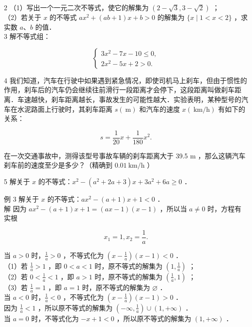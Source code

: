 \documentclass[10pt]{article}
\begin{document}
2 （1）写出一个一元二次不等式，使它的解集为 \((2-\sqrt{3}, 3-\sqrt{2})\) ；\\
（2）若关于 \(x\) 的不等式 \(a x^{2}+(a b+1) x+b>0\) 的解集为 \(\{x \mid 1<x<2\}\) ，求实数 \(a 、 b\) 的值．\\
3 解不等式组：

\[
\left\{\begin{array}{l}
3 x^{2}-7 x-10 \leqslant 0, \\
2 x^{2}-5 x+2>0 .
\end{array}\right.
\]

4 我们知道，汽车在行驶中如果遇到紧急情况，即使司机马上刹车，但由于惯性的作用，刹车后的汽车仍会继续往前滑行一段距离才会停下，这段距离叫做刹车距离．车速越快，刹车距离越长，事故发生的可能性越大．实验表明，某种型号的汽车在水泥路面上行驶时，其刹车距离 \(s(\mathrm{~m})\) 和汽车的速度 \(x(\mathrm{~km} / \mathrm{h})\) 有如下的关系：

\[
s=\frac{1}{20} x+\frac{1}{180} x^{2} .
\]

在一次交通事故中，测得该型号事故车辆的刹车距离大于 39.5 m ，那么这辆汽车刹车前的速度至少是多少？（精确到 \(0.01 \mathrm{~km} / \mathrm{h}\) ）

5 解关于 \(x\) 的不等式：\(x^{2}-\left(a^{2}+2 a+3\right) x+3 a^{2}+6 a \geqslant 0\) ．

例 3 解关于 \(x\) 的不等式：\(a x^{2}-(a+1) x+1<0\) ．\\
解 因为 \(a x^{2}-(a+1) x+1=(a x-1)(x-1)\) ，所以当 \(a \neq 0\) 时，方程有实根

\[
x_{1}=1, x_{2}=\frac{1}{a} .
\]

当 \(a>0\) 时，\(\frac{1}{a}>0\) ，不等式化为 \(\left(x-\frac{1}{a}\right)(x-1)<0\) ．\\
（1）若 \(\frac{1}{a}>1\) ，即 \(0<a<1\) 时，原不等式的解集为 \(\left(1, \frac{1}{a}\right)\) ；\\
（2）若 \(0<\frac{1}{a}<1\) ，即 \(a>1\) 时，原不等式的解集为 \(\left(\frac{1}{a}, 1\right)\) ；\\
（3）若 \(\frac{1}{a}=1\) ，即 \(a=1\) 时，原不等式的解集为 \(\varnothing\) ．\\
当 \(a<0\) 时，\(\frac{1}{a}<0\) ，不等式化为 \(\left(x-\frac{1}{a}\right)(x-1)>0\) ．\\
因为 \(\frac{1}{a}<1\) ，所以原不等式的解集为 \(\left(-\infty, \frac{1}{a}\right) \cup(1,+\infty)\) ．\\
当 \(a=0\) 时，不等式化为 \(-x+1<0\) ，所以原不等式的解集为 \((1,+\infty)\) ．
\end{document}
